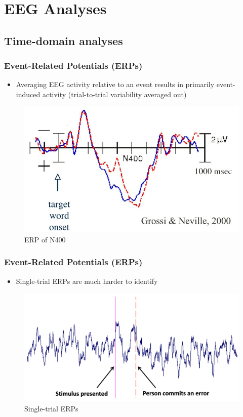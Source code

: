 \documentclass{beamer}
\begin{document}
\section{EEG Analyses}

\subsection{Time-domain analyses}

\begin{frame}
\frametitle{Event-Related Potentials (ERPs)}
\begin{itemize}
	\item Averaging EEG activity relative to an event results in primarily event-induced activity (trial-to-trial variability averaged out)
\end{itemize}
	\begin{figure}
		\includegraphics[width=0.7\linewidth]{image/erp}
		\caption{ERP of N400}
	\end{figure}
\end{frame}

\begin{frame}
\frametitle{Event-Related Potentials (ERPs)}
\begin{itemize}
	\item Single-trial ERPs are much harder to identify
\end{itemize}
	\begin{figure}
		\includegraphics[width=0.8\linewidth]{image/erp2}
		\caption{Single-trial ERPs}
	\end{figure}
\end{frame}
\end{document}
